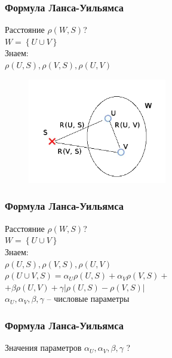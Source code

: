 \documentclass[12pt]{beamer}
\begin{document}
\begin{frame}\frametitle{Формула Ланса-Уильямса}
\begin{minipage}[t]{0.55\linewidth}
Расстояние $\rho(W, S)$?\\
${ W = \left\{ U \cup V \right\} }$\\

Знаем:\\
${\rho(U, S), \rho(V, S), \rho(U, V)}$

\end{minipage}%
\begin{minipage}[t]{0.45\linewidth}
    \begin{figure}[htbp]
  \includegraphics[height=130pt, keepaspectratio = true]{images/lans-formula}  
\end{figure}
\end{minipage}%

\end{frame}

\begin{frame}\frametitle{Формула Ланса-Уильямса}
Расстояние $\rho(W, S)$?\\
${ W = \left\{ U \cup V \right\} }$\\
\vspace{5mm}
Знаем:\\
${\rho(U, S), \rho(V, S), \rho(U, V)}$\\
\vspace{5mm}
${\rho(U \cup V, S) = \alpha_U \rho(U, S) + \alpha_V \rho(V, S) + }$ \\
\hspace{30mm} ${ + \beta \rho(U, V) + \gamma \vert \rho(U, S) - \rho(V, S)\vert}$\\
\vspace{5mm}
${\alpha_U, \alpha_V, \beta, \gamma}$ -- числовые параметры
\end{frame}

\begin{frame}\frametitle{Формула Ланса-Уильямса}
Значения параметров
${\alpha_U, \alpha_V, \beta, \gamma}$ ?
\end{frame}
\end{document}
